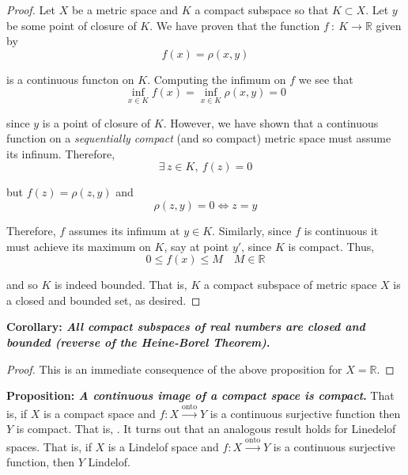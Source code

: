 \documentclass[12pt]{article}
\newlength\tindent
\renewcommand{\indent}{\hspace*{\tindent}}
\newcommand{\R}{\mathbb R}
\begin{document}
\begin{proof} Let $X$ be a metric space and $K$ a compact subspace so that $K \subset X$. Let $y$ be some point of closure of $K$. We have proven that the function $f ~:~ K \to \R$ given by
\begin{equation*}
	f(x) = \rho(x,y)
\end{equation*}

is a continuous functon on $K$. Computing the infimum on $f$ we see that
\begin{equation*}
	\inf_{x\in K} f(x) = \inf_{x\in K} \rho(x,y) = 0
\end{equation*}

since $y$ is a point of closure of $K$. However, we have shown that a continuous function on a {\em sequentially compact} (and so compact) metric space must assume its infinum. Therefore, 
\begin{equation*}
	\exists\,z\in K,~f(z) = 0
\end{equation*}

but $f(z) = \rho(z,y)$ and
\begin{equation*}
	\rho(z,y) = 0 \iff z = y
\end{equation*}

\indent Therefore, $f$ assumes its infimum at $y \in K$. Similarly, since $f$ is continuous it must achieve its maximum on $K$, say at point $y'$, since $K$ is compact. Thus,
\begin{equation*}
		0 \leq f(x) \leq M \quad M \in \R
\end{equation*}

and so $K$ is indeed bounded. That is, $K$ a compact subspace of metric space $X$ is a closed and bounded set, as desired.
\end{proof}

%
%
{\bf Corollary: {\em All compact subspaces of real numbers are closed and bounded (reverse of the Heine-Borel Theorem)}.}

\begin{proof} This is an immediate consequence of the above proposition for $X = \R$.
\end{proof}

%
%
{\bf Proposition: {\em A continuous image of a compact space is compact}.} That is, if $X$ is a compact space and $f:X\stackrel{\textrm{onto}}{\to}Y$ is a continuous surjective function then $Y$ is compact. That is, . It turns out that an analogous result holds for Linedelof spaces. That is, if $X$ is a Lindelof space and $f:X\stackrel{\text{onto}}{\to} Y$ is a continuous surjective function, then $Y$ Lindelof. \\
\end{document}
